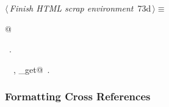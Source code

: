 \documentclass[a4paper]{report}
\begin{document}
\begin{flushleft} \small
\begin{minipage}{\linewidth}\label{scrap146}\raggedright\small
{} $\langle\,${\it Finish HTML scrap environment}\nobreak\ {\footnotesize {73d}}$\,\rangle\equiv$
\vspace{-1ex}
\begin{list}{}{} \item
\mbox{}@{\NWsep}
\end{list}
\vspace{-1.5ex}
\footnotesize
\begin{list}{}{\setlength{\itemsep}{-\parsep}\setlength{\itemindent}{-\leftmargin}}
\item \NWtxtMacroRefIn\ .
\item \NWtxtIdentsUsed\nobreak\  \verb@fputs@\nobreak\ , \verb@source_get@\nobreak\ .
\item{}
\end{list}
\end{minipage}\vspace{4ex}
\end{flushleft}
\subsubsection{Formatting Cross References}
\end{document}
